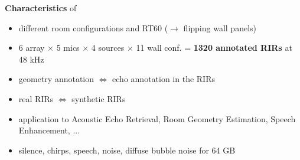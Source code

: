 \begin{frame}[t]{\dechorate  \hfill\faDatabase}
    \vspace{2mm}
    \begin{mycontriblock}{\textbf{Characteristics} of \dechorate}
        \begin{itemize}\small
            \item different room configurations and RT60 ($\to$ flipping wall panels)
            \item 6 array $\times$ 5 mics $\times$ 4 sources $\times$ 11 wall conf. = \textbf{1320 annotated RIRs} at 48 kHz
            \item geometry annotation $\Leftrightarrow$ echo annotation in the RIRs
            \item real RIRs $\Leftrightarrow$ synthetic RIRs
            \item application to  Acoustic Echo Retrieval, Room Geometry Estimation, Speech Enhancement, ...
            \item silence, chirps, speech, noise, diffuse bubble noise for 64 GB
        \end{itemize}
    \hfill {\small {}}
    \end{mycontriblock}


\end{frame}
